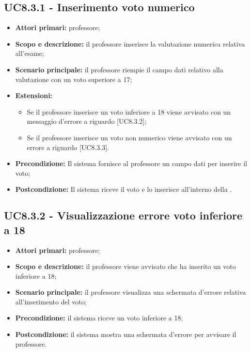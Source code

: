 \documentclass[AnalisiDeiRequisiti.tex]{subfiles}
\begin{document}
\subsection{UC8.3.1 - Inserimento voto numerico}
\begin{itemize}
	\item \textbf{Attori primari:} professore;
	\item \textbf{Scopo e descrizione:} il professore inserisce la valutazione numerica relativa all'esame;
	\item \textbf{Scenario principale:} il professore riempie il campo dati relativo alla valutazione con un voto superiore a 17;
	\item \textbf{Estensioni:}
	\begin{itemize}
		\item Se il professore inserisce un voto inferiore a 18 viene avvisato con un messaggio d'errore a riguardo [UC8.3.2];
		\item Se il professore inserisce un voto non numerico viene avvisato con un errore a riguardo [UC8.3.3].
	\end{itemize}
	\item \textbf{Precondizione:} Il sistema fornisce al professore un campo dati per inserire il voto; 
	\item \textbf{Postcondizione:} Il sistema riceve il voto e lo inserisce all'interno della .
\end{itemize}
\subsection{UC8.3.2 - Visualizzazione errore voto inferiore a 18}
\begin{itemize}
	\item \textbf{Attori primari:} professore;
	\item \textbf{Scopo e descrizione:} il professore viene avvisato che ha inserito un voto inferiore a 18;
	\item \textbf{Scenario principale:} il professore visualizza una schermata d'errore relativa all'inserimento del voto;
	\item \textbf{Precondizione:} il sistema riceve un voto inferiore a 18; 
	\item \textbf{Postcondizione:} il sistema mostra una schermata d'errore per avvisare il professore.
\end{itemize}
\end{document}
